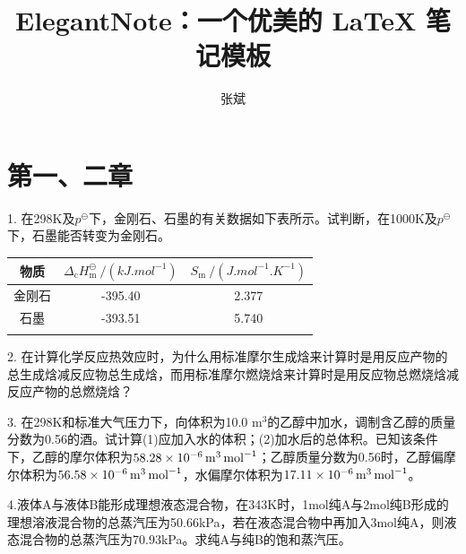 \documentclass[a4paper]{article}
\title{ElegantNote：一个优美的 \LaTeX{} 笔记模板}
\author{张斌}
\begin{document}
\section{第一、二章}
1. 在298K及$p^\ominus$下，金刚石、石墨的有关数据如下表所示。试判断，在1000K及$p^\ominus$下，石墨能否转变为金刚石。
\begin{table}[h]
    \centering
    \begin{tabular}{ccc}
        \Xhline{1pt}
        物质 & $\Delta_\mathrm{c}H_\mathrm{m}^\ominus ~/(\si{kJ.mol^{-1}})$ & $S_\mathrm{m} ~/(\si{J.mol^{-1}.K^{-1}})$ \\
        \hline
        金刚石 & -395.40 & 2.377 \\
        石墨 & -393.51 & 5.740 \\
        \Xhline{1pt} 
    \end{tabular}
\end{table}

2. 在计算化学反应热效应时，为什么用标准摩尔生成焓来计算时是用反应产物的总生成焓减反应物总生成焓，而用标准摩尔燃烧焓来计算时是用反应物总燃烧焓减反应产物的总燃烧焓？
\bigskip

3. 在298K和标准大气压力下，向体积为10.0 m$^3$的乙醇中加水，调制含乙醇的质量分数为0.56的酒。试计算(1)应加入水的体积；(2)加水后的总体积。已知该条件下，乙醇的摩尔体积为$\SI{58.28e{-6}}{m^3.mol^{-1}}$；乙醇质量分数为0.56时，乙醇偏摩尔体积为$\SI{56.58e{-6}}{m^3.mol^{-1}}$，水偏摩尔体积为$\SI{17.11e{-6}}{m^3.mol^{-1}}$。
\bigskip

4.液体A与液体B能形成理想液态混合物，在343K时，1mol纯A与2mol纯B形成的理想溶液混合物的总蒸汽压为50.66kPa，若在液态混合物中再加入3mol纯A，则液态混合物的总蒸汽压为70.93kPa。求纯A与纯B的饱和蒸汽压。
\end{document}
